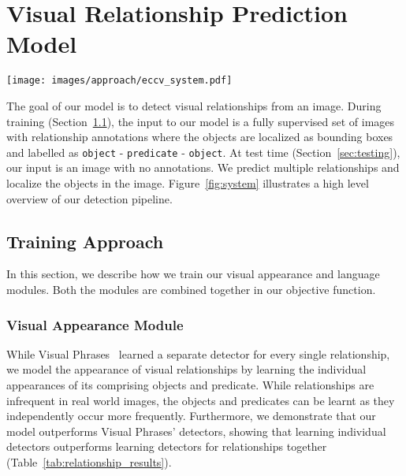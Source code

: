\documentclass[runningheads]{llncs}
\newcommand{\relationship}[3]{\texttt{#1} - \texttt{#2} - \texttt{#3}}
\newcommand{\eg}[1]{e.g. #1}
\begin{document}
\section{Visual Relationship Prediction Model}
\begin{figure*}[t]
\centering
\setlength{\belowcaptionskip}{-20pt}
\texttt{[image: images/approach/eccv\_system.pdf]}
\caption{A overview of our visual relationship detection pipeline. Given an image as input, RCNN~\cite{girshick14CVPR} generates a set of object proposals. Each pair of object proposals is then scored using a (1) visual appearance module and a (2) language module. These scores are then thresholded to output a set of relationship labels (\eg \relationship{person}{riding}{horse}). Both objects in a relationship (\eg \texttt{person} and \texttt{horse}) are localized as bounding boxes. The parameters of those two modules ( and ) are iteratively learnt in Section~\ref{sec:training}.}
\label{fig:system}
\end{figure*}

The goal of our model is to detect visual relationships from an image. During training (Section~\ref{sec:training}), the input to our model is a fully supervised set of images with relationship annotations where the objects are localized as bounding boxes and labelled as \relationship{object}{predicate}{object}. At test time (Section~\ref{sec:testing}), our input is an image with no annotations. We predict multiple relationships and localize the objects in the image. Figure~\ref{fig:system} illustrates a high level overview of our detection pipeline.

\subsection{Training Approach}
\label{sec:training}
In this section, we describe how we train our visual appearance and language modules. Both the modules are combined together in our objective function.

\subsubsection{Visual Appearance Module}
\label{sec:scale}
While Visual Phrases~\cite{sadeghi2011recognition} learned a separate detector for every single relationship, we model the appearance of visual relationships  by learning the individual appearances of its comprising objects and predicate. While relationships are infrequent in real world images, the objects and predicates can be learnt as they independently occur more frequently. Furthermore, we demonstrate that our model outperforms Visual Phrases' detectors, showing that learning individual detectors outperforms learning detectors for relationships together (Table~\ref{tab:relationship_results}).
\end{document}
